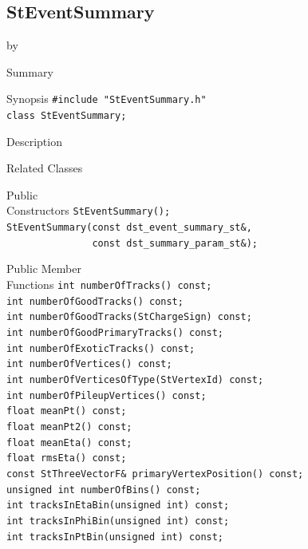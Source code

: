 \documentclass[twoside]{article}
\newcommand{\entrylabel}[1]{\mbox{\textbf{{#1}}}\hfil}%
\newenvironment{entry}
{\begin{list}{}%
    {\renewcommand{\makelabel}{\entrylabel}%
     \setlength{\labelwidth}{90pt}%
     \setlength{\leftmargin}{\labelwidth}
     \advance\leftmargin by \labelsep%
      }%
    }%
  {\end{list}}
\newcommand{\Entrylabel}[1]%
{\raisebox{0pt}[1ex][0pt]{\makebox[\labelwidth][l]%
    {\parbox[t]{\labelwidth}{\hspace{0pt}\textbf{{#1}}}}}}
\newenvironment{Entry}%
{\renewcommand{\entrylabel}{\Entrylabel}\begin{entry}}%
  {\end{entry}}
\begin{document}
\subsection{StEventSummary}
\label{sec:StEventSummary}
\begin{Entry}
\item[Summary]
\item[Synopsis]
    \verb+#include "StEventSummary.h"+\\
    \verb+class StEventSummary;+\\
\item[Description]
\item[Related Classes]
\item[Public\\ Constructors]
    \verb+StEventSummary();+\\
    \verb+StEventSummary(const dst_event_summary_st&,+\\
    \verb+               const dst_summary_param_st&);+\\
\item[Public Member\\ Functions]
    \verb+int numberOfTracks() const;+\\
    \verb+int numberOfGoodTracks() const;+\\
    \verb+int numberOfGoodTracks(StChargeSign) const;+\\
    \verb+int numberOfGoodPrimaryTracks() const;+\\
    \verb+int numberOfExoticTracks() const;+\\
    \verb+int numberOfVertices() const;+\\
    \verb+int numberOfVerticesOfType(StVertexId) const;+\\
    \verb+int numberOfPileupVertices() const;+\\
    \verb+float meanPt() const;+\\
    \verb+float meanPt2() const;+\\
    \verb+float meanEta() const;+\\
    \verb+float rmsEta() const;+\\
    \verb+const StThreeVectorF& primaryVertexPosition() const;+\\
    \verb+unsigned int numberOfBins() const;+\\
    \verb+int tracksInEtaBin(unsigned int) const;+\\
    \verb+int tracksInPhiBin(unsigned int) const;+\\
    \verb+int tracksInPtBin(unsigned int) const;+\\

\end{Entry}
\end{document}
